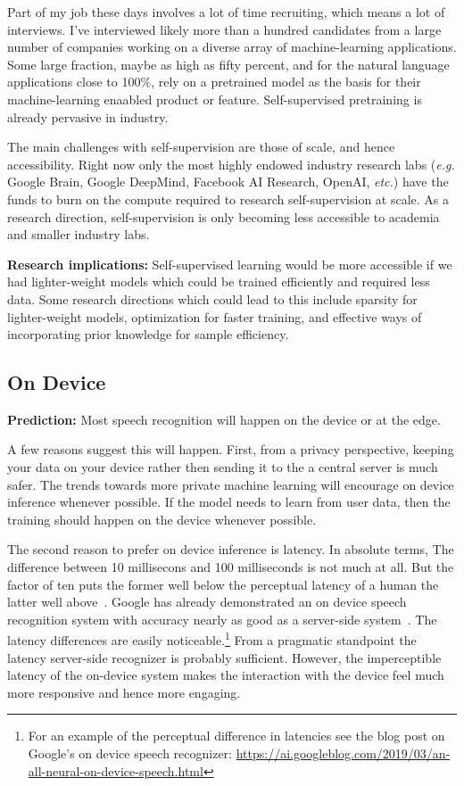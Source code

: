 Part of my job these days involves a lot of time recruiting, which means a lot
of interviews. I've interviewed likely more than a hundred candidates from a
large number of companies working on a diverse array of machine-learning
applications. Some large fraction, maybe as high as fifty percent, and for the
natural language applications close to 100\%, rely on a pretrained model as the
basis for their machine-learning enaabled product or feature. Self-supervised
pretraining is already pervasive in industry.

The main challenges with self-supervision are those of scale, and hence
accessibility. Right now only the most highly endowed industry research labs
(\emph{e.g.} Google Brain, Google DeepMind, Facebook AI Research, OpenAI,
\emph{etc.}) have the funds to burn on the compute required to research
self-supervision at scale. As a research direction, self-supervision is only
becoming less accessible to academia and smaller industry labs.

{\bf Research implications:} Self-supervised learning would be more
accessible if we had lighter-weight models which could be trained efficiently
and required less data. Some research directions which could lead to
this include sparsity for lighter-weight models, optimization for faster
training, and effective ways of incorporating prior knowledge for sample
efficiency.

\subsection{On Device}
\label{sec:on_device}

{\bf Prediction:} Most speech recognition will happen on the device or at the
edge.

A few reasons suggest this will happen. First, from a privacy perspective,
keeping your data on your device rather then sending it to the a central server
is much safer. The trends towards more private machine learning will encourage
on device inference whenever possible. If the model needs to learn from user
data, then the training should happen on the device whenever possible.

The second reason to prefer on device inference is latency. In absolute terms,
The difference between 10 millisecons and 100 milliseconds is not much at all.
But the factor of ten puts the former well below the perceptual latency of a
human the latter well above~\citep{lago2004quest, levitin2000perception}.
Google has already demonstrated an on device speech recognition system with
accuracy nearly as good as a server-side system~\citep{he2019streaming}. The
latency differences are easily noticeable.\footnote{For an example of the
perceptual difference in latencies see the blog post on Google's on device
speech recognizer:
\url{https://ai.googleblog.com/2019/03/an-all-neural-on-device-speech.html}}
From a pragmatic standpoint the latency server-side recognizer is probably
sufficient. However, the imperceptible latency of the on-device system makes
the interaction with the device feel much more responsive and hence more
engaging.

